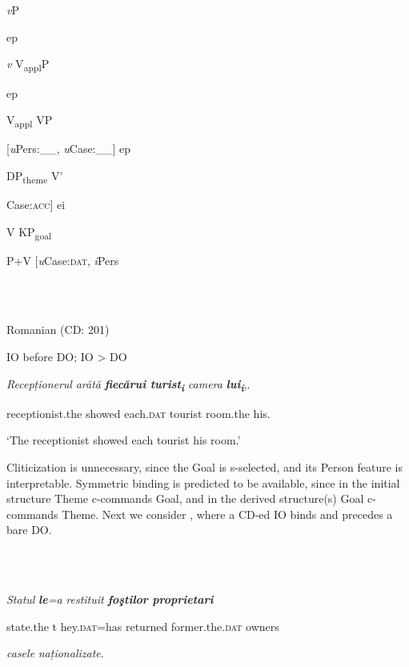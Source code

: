 \documentclass[output=paper,modfonts,nonflat]{langsci/langscibook}
\begin{document}
\ea%
    \label{ex:key:32}
    \gll\\
        \\
    \glt
    \z

            \textit{v}P

  ep

  \textit{v}           V\textsubscript{appl}P

      ep

    V\textsubscript{appl}        VP

    [\textit{u}Pers:\_\_, \textit{u}Case:\_\_]  ep

          DP\textsubscript{theme}      V’

Case:\textsc{acc}]  ei

    V      KP\textsubscript{goal}

          P+V    [\textit{u}Case:\textsc{dat}, \textit{i}Pers

\ea%
    \label{ex:key:33}
    \gll\\
        \\
    \glt
    \z

          Romanian (CD\citealt{Tb2017}: 201)

IO before DO; IO > DO 

  \textit{Recepționerul}  \textit{arătă}    \textbf{\textit{fiecărui} \textit{turist}}\textbf{\textit{\textsubscript{i}}}    \textit{camera} \textbf{\textit{lui}}\textbf{\textit{\textsubscript{i}}},.

  receptionist.the  showed   each.\textsc{dat} tourist   room.the his.

  ‘The receptionist showed each tourist his room.’

Cliticization is unnecessary, since the Goal is s-selected, and its Person feature is interpretable. Symmetric binding is predicted to be available, since in the initial structure Theme c-commands Goal, and in the derived structure(s) Goal c-commands Theme. Next we consider , where a CD-ed IO binds and precedes a bare DO. 

\ea%
    \label{ex:key:34}
    \gll\\
        \\
    \glt
    \z

          \textit{Statul}    \textbf{\textit{le}}\textit{=a}   \textit{restituit}    \textbf{\textit{foştilor} \textit{proprietari}}    

state.the t  hey.\textsc{dat}=has returned   former.the.\textsc{dat}       owners 

\textit{casele}     \textit{naționalizate}.
\end{document}
